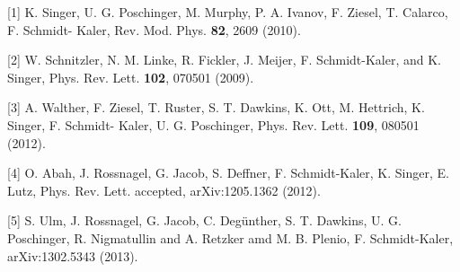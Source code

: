 {\normalsize
[1] K. Singer, U. G. Poschinger, M. Murphy, P. A. Ivanov, F. Ziesel, T. Calarco, F. Schmidt- Kaler,
Rev. Mod. Phys. \textbf{82}, 2609 (2010).
\vsp

[2] W. Schnitzler, N. M. Linke, R. Fickler, J. Meijer, F. Schmidt-Kaler, and K. Singer, Phys. Rev.
Lett. \textbf{102}, 070501 (2009).
\vsp

[3] A. Walther, F. Ziesel, T. Ruster, S. T. Dawkins, K. Ott, M. Hettrich, K. Singer, F. Schmidt-
Kaler, U. G. Poschinger, Phys. Rev. Lett. \textbf{109}, 080501 (2012).
\vsp

[4] O. Abah, J. Rossnagel, G. Jacob, S. Deffner, F. Schmidt-Kaler, K. Singer, E. Lutz, Phys. Rev.
Lett. accepted, arXiv:1205.1362 (2012).
\vsp

[5] S. Ulm, J. Rossnagel, G. Jacob, C. Deg\"unther, S. T. Dawkins, U. G. Poschinger, R. Nigmatullin and
A. Retzker amd M. B. Plenio, F. Schmidt-Kaler, arXiv:1302.5343 (2013).
}

\vspace{\baselineskip}

